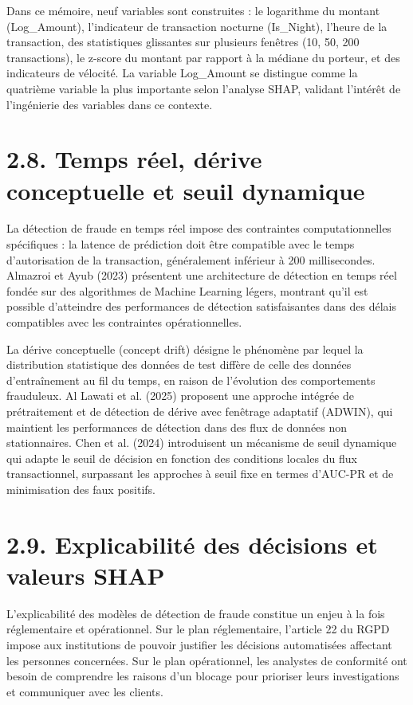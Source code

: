 Dans ce mémoire, neuf variables sont construites : le logarithme du montant (Log\_Amount), l'indicateur de transaction nocturne (Is\_Night), l'heure de la transaction, des statistiques glissantes sur plusieurs fenêtres (10, 50, 200 transactions), le z-score du montant par rapport à la médiane du porteur, et des indicateurs de vélocité. La variable Log\_Amount se distingue comme la quatrième variable la plus importante selon l'analyse SHAP, validant l'intérêt de l'ingénierie des variables dans ce contexte.

\section{2.8. Temps réel, dérive conceptuelle et seuil dynamique}

La détection de fraude en temps réel impose des contraintes computationnelles spécifiques : la latence de prédiction doit être compatible avec le temps d'autorisation de la transaction, généralement inférieur à 200 millisecondes. Almazroi et Ayub (2023) présentent une architecture de détection en temps réel fondée sur des algorithmes de Machine Learning légers, montrant qu'il est possible d'atteindre des performances de détection satisfaisantes dans des délais compatibles avec les contraintes opérationnelles.

La dérive conceptuelle (concept drift) désigne le phénomène par lequel la distribution statistique des données de test diffère de celle des données d'entraînement au fil du temps, en raison de l'évolution des comportements frauduleux. Al Lawati et al. (2025) proposent une approche intégrée de prétraitement et de détection de dérive avec fenêtrage adaptatif (ADWIN), qui maintient les performances de détection dans des flux de données non stationnaires. Chen et al. (2024) introduisent un mécanisme de seuil dynamique qui adapte le seuil de décision en fonction des conditions locales du flux transactionnel, surpassant les approches à seuil fixe en termes d'AUC-PR et de minimisation des faux positifs.

\section{2.9. Explicabilité des décisions et valeurs SHAP}

L'explicabilité des modèles de détection de fraude constitue un enjeu à la fois réglementaire et opérationnel. Sur le plan réglementaire, l'article 22 du RGPD impose aux institutions de pouvoir justifier les décisions automatisées affectant les personnes concernées. Sur le plan opérationnel, les analystes de conformité ont besoin de comprendre les raisons d'un blocage pour prioriser leurs investigations et communiquer avec les clients.

